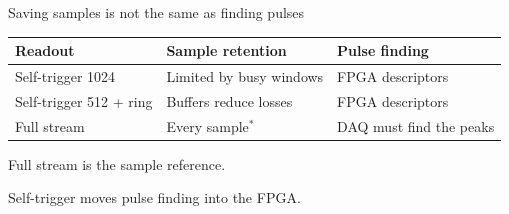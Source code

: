 
\begin{frame}{Saving samples is not the same as finding pulses}
  \centering
  \renewcommand{\arraystretch}{1.6}
  \begin{tabular}{@{}lll@{}}
    \toprule
    Readout & Sample retention & Pulse finding \\
    \midrule
    Self-trigger 1024 & Limited by busy windows & FPGA descriptors \\
    Self-trigger 512 + ring & Buffers reduce losses & FPGA descriptors \\
    Full stream & Every sample$^{*}$ & DAQ must find the peaks \\
    \bottomrule
  \end{tabular}\par\medskip
  Full stream is the sample reference.\par\smallskip
  Self-trigger moves pulse finding into the FPGA.\par\medskip
\end{frame}
